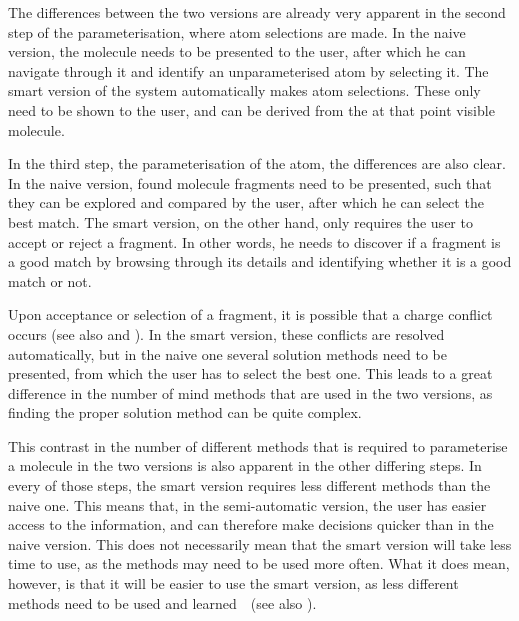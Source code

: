 The differences between the two versions are already very apparent in the second step of the parameterisation, where atom selections are made. In the naive version, the molecule needs to be presented to the user, after which he can navigate through it and identify an unparameterised atom by selecting it. The smart version of the system automatically makes atom selections. These only need to be shown to the user, and can be derived from the at that point visible molecule.

In the third step, the parameterisation of the atom, the differences are also clear. In the naive version, found molecule fragments need to be presented, such that they can be explored and compared by the user, after which he can select the best match. The smart version, on the other hand, only requires the user to accept or reject a fragment. In other words, he needs to discover if a fragment is a good match by browsing through its details and identifying whether it is a good match or not.

Upon acceptance or selection of a fragment, it is possible that a charge conflict occurs (see also  and ). In the smart version, these conflicts are resolved automatically, but in the naive one several solution methods need to be presented, from which the user has to select the best one. This leads to a great difference in the number of mind methods that are used in the two versions, as finding the proper solution method can be quite complex.

This contrast in the number of different methods that is required to parameterise a molecule in the two versions is also apparent in the other differing steps. In every of those steps, the smart version requires less different methods than the naive one. This means that, in the semi-automatic version, the user has easier access to the information, and can therefore make decisions quicker than in the naive version. This does not necessarily mean that the smart version will take less time to use, as the methods may need to be used more often. What it does mean, however, is that it will be easier to use the smart version, as less different methods need to be used and learned~\cite{sweller1994cognitive}~(see also ).
